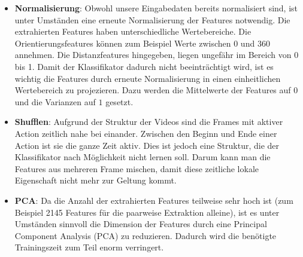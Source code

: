 \begin{itemize}

  \item \textbf{Normalisierung}: Obwohl unsere Eingabedaten bereits normalisiert sind, ist unter Umständen eine erneute Normalisierung der Features notwendig. Die extrahierten
        Features haben unterschiedliche Wertebereiche. Die Orientierungsfeatures können zum Beispiel Werte zwischen 0 und 360 annehmen. Die Distanzfeatures hingegeben, liegen
        ungefähr im Bereich von 0 bis 1. Damit der Klassifikator dadurch nicht beeinträchtigt wird, ist es wichtig die Features durch erneute Normalisierung in einen einheitlichen
        Wertebereich zu projezieren. Dazu werden die Mittelwerte der Features auf $0$ und die Varianzen auf $1$ gesetzt.

  \item \textbf{Shufflen}: 
    Aufgrund der Struktur der Videos sind die Frames mit aktiver Action zeitlich nahe bei einander. Zwischen den Beginn und Ende einer Action ist sie die ganze Zeit aktiv.
    Dies ist jedoch eine Struktur, die der Klassifikator nach Möglichkeit nicht lernen soll. Darum kann man die Features aus mehreren Frame mischen, damit diese zeitliche lokale Eigenschaft nicht mehr zur Geltung kommt.

  \item \textbf{PCA}: Da die Anzahl der extrahierten Features teilweise sehr hoch ist (zum Beispiel 2145 Features für die paarweise Extraktion alleine), ist es unter Umständen
    sinnvoll die Dimension der Features durch eine Principal Component Analysis (PCA) zu reduzieren. Dadurch wird die benötigte Trainingszeit zum Teil enorm verringert. 
\end{itemize}

